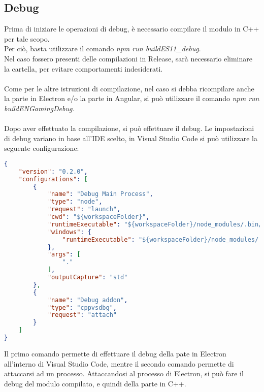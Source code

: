\subsection{Debug}
Prima di iniziare le operazioni di debug, è necessario compilare il modulo in C++ per tale scopo.\\ Per ciò, basta utilizzare il comando \textit{npm run buildES11_debug}.\\ Nel caso fossero presenti delle compilazioni in Release, sarà necessario eliminare la cartella, per evitare comportamenti indesiderati.\\\\
Come per le altre istruzioni di compilazione, nel caso si debba ricompilare anche la parte in Electron e/o la parte in Angular, si può utilizzare il comando \textit{npm run buildENGamingDebug}.\\\\
Dopo aver effettuato la compilazione, si può effettuare il debug. Le impostazioni di debug variano in base all'IDE scelto, in Visual Studio Code si può utilizzare la seguente configurazione:
\begin{lstlisting}[language=json,firstnumber=1]
{
    "version": "0.2.0",
    "configurations": [
        {
            "name": "Debug Main Process",
            "type": "node",
            "request": "launch",
            "cwd": "${workspaceFolder}",
            "runtimeExecutable": "${workspaceFolder}/node_modules/.bin/electron",
            "windows": {
                "runtimeExecutable": "${workspaceFolder}/node_modules/.bin/electron.cmd"
            },
            "args": [
                "."
            ],
            "outputCapture": "std"
        },
        {
            "name": "Debug addon",
            "type": "cppvsdbg",
            "request": "attach"
        }
    ]
}
\end{lstlisting}
Il primo comando permette di effettuare il debug della pate in Electron all'interno di Visual Studio Code, mentre il secondo comando permette di attaccarsi ad un processo. Attaccandosi al processo di Electron, si può fare il debug del modulo compilato, e quindi della parte in C++.
